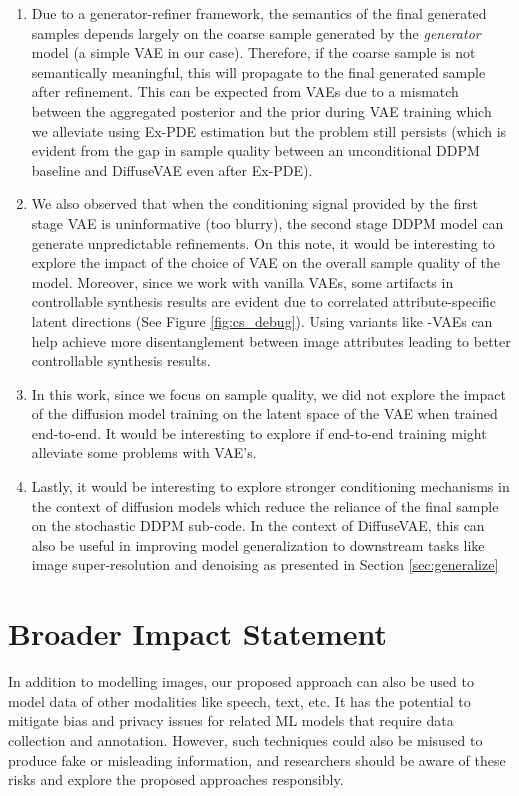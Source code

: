 \documentclass[10pt]{article} \usepackage[accepted]{tmlr}
\begin{document}
\begin{enumerate}
    \item Due to a generator-refiner framework, the semantics of the final generated samples depends largely on the coarse sample generated by the \textit{generator} model (a simple VAE in our case). Therefore, if the coarse sample is not semantically meaningful, this will propagate to the final generated sample after refinement. This can be expected from VAEs due to a mismatch between the aggregated posterior  and the prior  during VAE training which we alleviate using Ex-PDE estimation but the problem still persists (which is evident from the gap in sample quality between an unconditional DDPM baseline and DiffuseVAE even after Ex-PDE).
    
    \item We also observed that when the conditioning signal provided by the first stage VAE is uninformative (too blurry), the second stage DDPM model can generate unpredictable refinements. On this note, it would be interesting to explore the impact of the choice of VAE on the overall sample quality of the model. Moreover, since we work with vanilla VAEs, some artifacts in controllable synthesis results are evident due to correlated attribute-specific latent directions (See Figure \ref{fig:cs_debug}). Using variants like -VAEs \citep{Higgins2017betaVAELB} can help achieve more disentanglement between image attributes leading to better controllable synthesis results.
    
    \item In this work, since we focus on sample quality, we did not explore the impact of the diffusion model training on the latent space of the VAE when trained end-to-end. It would be interesting to explore if end-to-end training might alleviate some problems with VAE's.
    
    \item Lastly, it would be interesting to explore stronger conditioning mechanisms in the context of diffusion models which reduce the reliance of the final sample on the stochastic DDPM sub-code. In the context of DiffuseVAE, this can also be useful in improving model generalization to downstream tasks like image super-resolution and denoising as presented in Section \ref{sec:generalize}
\end{enumerate}





\section*{Broader Impact Statement}
In addition to modelling images, our proposed approach can also be used to model data of other modalities like speech, text, etc. It has the potential to mitigate bias and privacy issues for related ML models that require data collection and annotation. However, such techniques could also be misused to produce fake or misleading information, and researchers should be aware of these risks and explore the proposed approaches responsibly.
\end{document}
